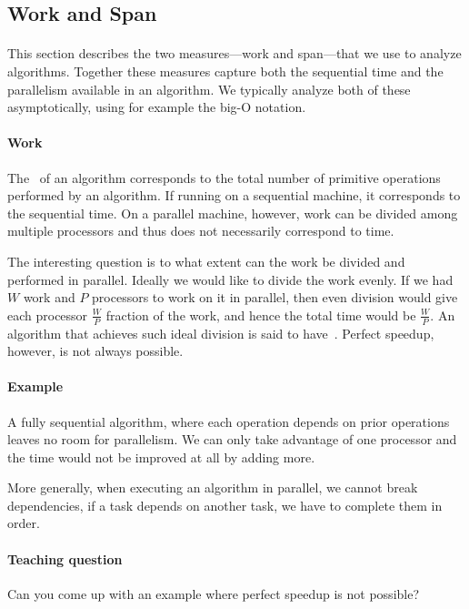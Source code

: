 \subsection{Work and Span}

\paragraph{}
This section describes the two measures---work and span---that we use
to analyze algorithms.  Together these measures capture both the
sequential time and the parallelism available in an algorithm.
%
We typically analyze both of these asymptotically, using
for example the big-O notation.
%


\paragraph{Work}
The~ of an algorithm corresponds to the total number of
primitive operations performed by an algorithm.  If running on a
sequential machine, it corresponds to the sequential time.
%
On a parallel machine, however, work can be divided among multiple
processors and thus does not necessarily correspond to time.
%

The interesting question is to what extent can the work be divided and
performed in parallel.  Ideally we would like to divide the work
evenly.  If we had $W$ work and $P$ processors to work on it in
parallel, then even division would give each processor $\frac{W}{P}$
fraction of the work, and hence the total time would be $\frac{W}{P}$.
%
An algorithm that achieves such ideal division is said to
have~.  Perfect speedup, however, is not always
possible.
%

\paragraph{Example}
A fully sequential algorithm, where each operation depends on prior
operations leaves no room for parallelism.
%
We can only take advantage of one processor and the time would not be
improved at all by adding more.  
%

More generally, when executing an algorithm in parallel, we cannot
break dependencies, if a task depends on another task, we have to
complete them in order.

\paragraph{Teaching question}
Can you come up with an example where perfect speedup is not possible?

